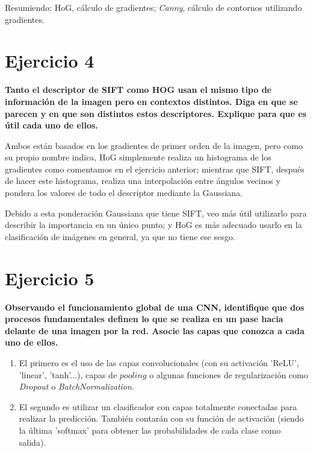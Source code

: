 \documentclass[11pt,a4paper]{article}
\begin{document}
Resumiendo: HoG, cálculo de gradientes; \textit{Canny}, cálculo de contornos utilizando gradientes.


\section*{Ejercicio 4}

\textbf{Tanto el descriptor de SIFT como HOG usan el mismo tipo de información de la imagen pero en contextos distintos. Diga en que se parecen y en que son
distintos estos descriptores. Explique para que es útil cada uno de ellos.}

Ambos están basados en los gradientes de primer orden de la imagen, pero como su propio nombre indica, HoG simplemente realiza un histograma de los gradientes
como comentamos en el ejercicio anterior; mientras que SIFT, después de hacer este histograma, realiza una interpolación entre ángulos vecinos y pondera los valores
de todo el descriptor mediante la Gaussiana.

Debido a esta ponderación Gaussiana que tiene SIFT, veo más útil utilizarlo para describir la importancia en un único punto; y HoG es más adecuado usarlo en
la clasificación de imágenes en general, ya que no tiene ese sesgo.


\section*{Ejercicio 5}

\textbf{Observando el funcionamiento global de una CNN, identifique que dos procesos fundamentales definen lo que se realiza en un pase hacia delante de una
imagen por la red. Asocie las capas que conozca a cada uno de ellos.}

\begin{enumerate}
    \item El primero es el uso de las capas convolucionales (con su activación 'ReLU', 'linear', 'tanh'...), capas de $pooling$ o algunas funciones de regularización
          como \textit{Dropout} o \textit{BatchNormalization}.
    \item El segundo es utilizar un clasificador con capas totalmente conectadas para realizar la predicción. También contarán con su función de activación (siendo la
          última 'softmax' para obtener las probabilidades de cada clase como salida).
\end{enumerate}
\end{document}
